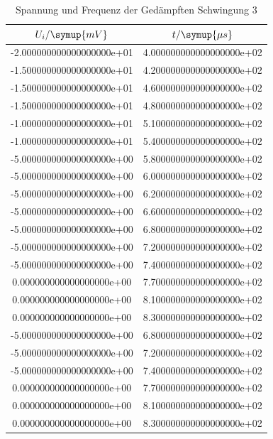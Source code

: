 \begin{table}
\begin{subfigure}{0.48\textwidth}
\begin{tabular}{S S}
\bottomrule
\end{tabular}
\end{subfigure}
\end{table}
\begin{table}
\centering
\caption{Spannung und Frequenz der Gedämpften Schwingung 3}
\label{tab:5a3tab}
\begin{tabular}{S S}
\toprule
{$U_i/\symup{mV}$} & {$t/\symup{\mu s}$ }\\
\midrule
-2.000000000000000000e+01 & 4.000000000000000000e+02\\
-1.500000000000000000e+01 & 4.200000000000000000e+02\\
-1.500000000000000000e+01 & 4.600000000000000000e+02\\
-1.500000000000000000e+01 & 4.800000000000000000e+02\\
-1.000000000000000000e+01 & 5.100000000000000000e+02\\
-1.000000000000000000e+01 & 5.400000000000000000e+02\\
-5.000000000000000000e+00 & 5.800000000000000000e+02\\
-5.000000000000000000e+00 & 6.000000000000000000e+02\\
-5.000000000000000000e+00 & 6.200000000000000000e+02\\
-5.000000000000000000e+00 & 6.600000000000000000e+02\\
-5.000000000000000000e+00 & 6.800000000000000000e+02\\
-5.000000000000000000e+00 & 7.200000000000000000e+02\\
-5.000000000000000000e+00 & 7.400000000000000000e+02\\
0.000000000000000000e+00 & 7.700000000000000000e+02\\
0.000000000000000000e+00 & 8.100000000000000000e+02\\
0.000000000000000000e+00 & 8.300000000000000000e+02\\
-5.000000000000000000e+00 & 6.800000000000000000e+02\\
-5.000000000000000000e+00 & 7.200000000000000000e+02\\
-5.000000000000000000e+00 & 7.400000000000000000e+02\\
0.000000000000000000e+00 & 7.700000000000000000e+02\\
0.000000000000000000e+00 & 8.100000000000000000e+02\\
0.000000000000000000e+00 & 8.300000000000000000e+02\\
\bottomrule
\end{tabular}
\end{table}
\FloatBarrier
